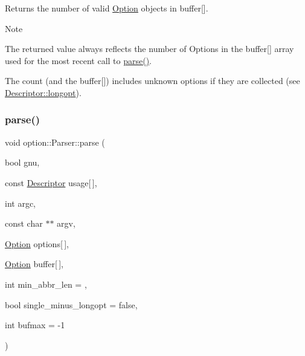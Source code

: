 Returns the number of valid \hyperlink{classoption_1_1Option}{Option} objects in {\ttfamily buffer}\mbox{[}\mbox{]}. 

\begin{DoxyNote}{Note}
\begin{DoxyItemize}
\item The returned value always reflects the number of Options in the buffer\mbox{[}\mbox{]} array used for the most recent call to \hyperlink{classoption_1_1Parser_a6e0b5778d1cfbd6cd51240e74d01e138}{parse()}. \item The count (and the buffer\mbox{[}\mbox{]}) includes unknown options if they are collected (see \hyperlink{structoption_1_1Descriptor_a470c449dfa894c9bfda2dae026142b4b}{Descriptor\+::longopt}). \end{DoxyItemize}

\end{DoxyNote}
\mbox{\label{classoption_1_1Parser_a6e0b5778d1cfbd6cd51240e74d01e138}} 
\subsubsection{\texorpdfstring{parse()}{parse()}}
{\footnotesize\ttfamily void option\+::\+Parser\+::parse (\begin{DoxyParamCaption}\item[{bool}]{gnu,  }\item[{const \hyperlink{structoption_1_1Descriptor}{Descriptor}}]{usage\mbox{[}$\,$\mbox{]},  }\item[{int}]{argc,  }\item[{const char $\ast$$\ast$}]{argv,  }\item[{\hyperlink{classoption_1_1Option}{Option}}]{options\mbox{[}$\,$\mbox{]},  }\item[{\hyperlink{classoption_1_1Option}{Option}}]{buffer\mbox{[}$\,$\mbox{]},  }\item[{int}]{min\+\_\+abbr\+\_\+len = {},  }\item[{bool}]{single\+\_\+minus\+\_\+longopt = {\ttfamily false},  }\item[{int}]{bufmax = {\ttfamily -\/1} }\end{DoxyParamCaption})\hspace{0.3cm}{\ttfamily [inline]}}



